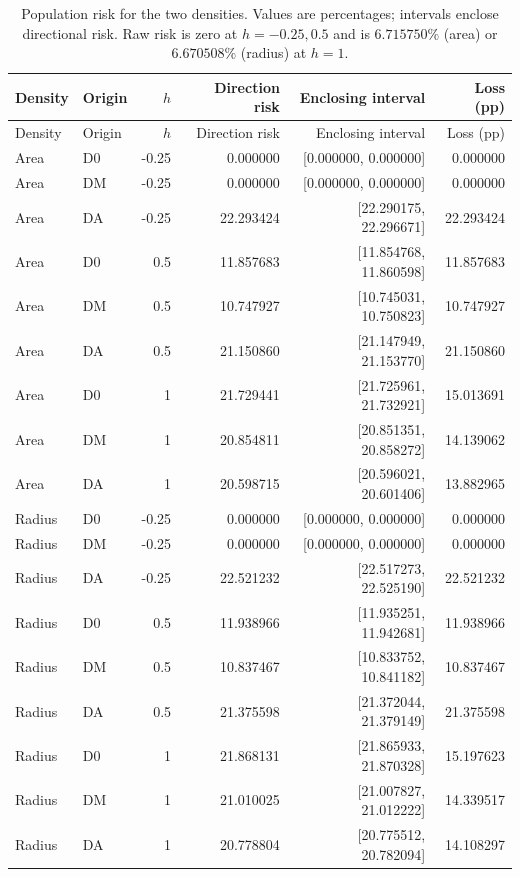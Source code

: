 \begin{longtable}{llrrrr}
\caption{Population risk for the two densities. Values are percentages; intervals enclose directional risk. Raw risk is zero at $h=-0.25,0.5$ and is $6.715750\%$ (area) or $6.670508\%$ (radius) at $h=1$.}\label{tab:oracles}\\
\toprule Density & Origin & $h$ & Direction risk & Enclosing interval & Loss (pp)\\\midrule\endfirsthead
\toprule Density & Origin & $h$ & Direction risk & Enclosing interval & Loss (pp)\\\midrule\endhead
Area & D0 & -0.25 & 0.000000 & [0.000000, 0.000000] & 0.000000 \\
Area & DM & -0.25 & 0.000000 & [0.000000, 0.000000] & 0.000000 \\
Area & DA & -0.25 & 22.293424 & [22.290175, 22.296671] & 22.293424 \\
Area & D0 & 0.5 & 11.857683 & [11.854768, 11.860598] & 11.857683 \\
Area & DM & 0.5 & 10.747927 & [10.745031, 10.750823] & 10.747927 \\
Area & DA & 0.5 & 21.150860 & [21.147949, 21.153770] & 21.150860 \\
Area & D0 & 1 & 21.729441 & [21.725961, 21.732921] & 15.013691 \\
Area & DM & 1 & 20.854811 & [20.851351, 20.858272] & 14.139062 \\
Area & DA & 1 & 20.598715 & [20.596021, 20.601406] & 13.882965 \\
Radius & D0 & -0.25 & 0.000000 & [0.000000, 0.000000] & 0.000000 \\
Radius & DM & -0.25 & 0.000000 & [0.000000, 0.000000] & 0.000000 \\
Radius & DA & -0.25 & 22.521232 & [22.517273, 22.525190] & 22.521232 \\
Radius & D0 & 0.5 & 11.938966 & [11.935251, 11.942681] & 11.938966 \\
Radius & DM & 0.5 & 10.837467 & [10.833752, 10.841182] & 10.837467 \\
Radius & DA & 0.5 & 21.375598 & [21.372044, 21.379149] & 21.375598 \\
Radius & D0 & 1 & 21.868131 & [21.865933, 21.870328] & 15.197623 \\
Radius & DM & 1 & 21.010025 & [21.007827, 21.012222] & 14.339517 \\
Radius & DA & 1 & 20.778804 & [20.775512, 20.782094] & 14.108297 \\
\bottomrule
\end{longtable}
